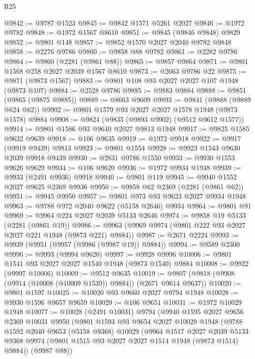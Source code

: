 \begin{lexlean}{R25}
\begin{coremodule}
@9842 := @9787 @1523
@9845 := @9842 @1571 @5261 @2027
@9846 := @1972 @9782
@9848 := @1972 @1567 @8610
@9851 := @9845 (@9846 @9848) @9829
@9852 := @9801 @148
@9857 := @9852 @1570 @2027 @2040 @9782 @9848
@9858 := @2276 @9786
@9860 := @9858 @88 @9782
@9861 := @2282 @9786
@9864 := @9860 (@2281 (@9861 @88))
@9865 := @9857 @9864
@9871 := @9801 @1568 @258 @2027 @2039 @1567 @8610
@9873 := @2663 @9786 @22
@9875 := @9871 (@9873 @1567)
@9883 := @9801 @108 @93 @2027 @2027 @107 @1948 (@9873 @107)
@9884 := @2528 @9786
@9885 := @9883 @9884
@9888 := @9851 (@9865 (@9875 @9885))
@9889 := @8663 @9609
@9893 := @9841 (@9888 (@9889 @624 @62))
@9902 := @9801 @1579 @93 @2027 @2027 @1578 @1948 (@9873 @1578) @9884
@9908 := @9824 (@9835 (@9893 @9902) (@9512 @9612 @1577))
@9914 := @9801 @1586 @93 @9640 @2027 @9813 @1948
@9917 := @9825 @1585 @9632 @9639
@9918 := @106 @9635
@9919 := @1972 @9918
@9922 := @9917 (@9919 @9439) @9813
@9923 := @9801 @1554
@9928 := @9923 @1543 @9630 @2039 @9918 @9439
@9930 := @2831 @9786 @1550
@9933 := @9930 @1553 @9626 @9629
@9934 := @106 @9620
@9936 := @1972 @9934 @1948
@9939 := @9933 (@2491 @9936) @9918
@9940 := @9801 @119
@9945 := @9940 @1552 @2027 @9625 @2369 @9936
@9950 := @9858 @62 @2369 (@2281 (@9861 @62))
@9951 := @9945 @9950
@9957 := @9801 @973 @93 @9623 @2027 @9934 @1948
@9963 := @9788 @972 @2040 @9622 (@5158 @2646) @9934
@9964 := @9801 @91
@9969 := @9964 @224 @2027 @2039 @5133 @2646
@9974 := @9858 @19 @5133 (@2281 (@9861 @19))
@9986 := @9963 (@9969 @9974 (@9801 @222 @93 @2027 @2027 @221 @1948 (@9873 @221) @9884))
@9987 := @2671 @2224
@9993 := @9939 (@9951 (@9957 (@9986 (@9987 @19)) @9884))
@9994 := @9589 @2300
@9996 := @9993 (@9994 @9620)
@9997 := @9928 @9996
@10006 := @9801 @1541 @93 @2027 @2027 @1540 @1948 (@9873 @1540) @9884
@10008 := @9922 (@9997 @10006)
@10009 := @9512 @9635
@10019 := @9807 (@9818 (@9908 (@9914 (@10008 (@10009 @1539)) @9884)) (@2671 @9614 @9637))
@10020 := @9801 @1597
@10025 := @10020 @93 @9660 @2027 @9794 @1948
@10028 := @9930 @1596 @9657 @9659
@10029 := @106 @9651
@10031 := @1972 @10029 @1948
@10077 := @10028
    (@2491 @10031)
    @9794
    (@9940
      @1595
      @2027
      @9656
      @2369
      @10031
      @9950
      (@9801
        @1593
        @93
        @9654
        @2027
        @10029
        @1948
        (@9788
          @1592
          @2040
          @9653
          (@5158 @9368)
          @10029
          (@9964
            @1517
            @2027
            @2039
            @5133
            @9368
            @9974
            (@9801 @1515 @93 @2027 @2027 @1514 @1948 (@9873 @1514) @9884))
          (@9987 @88))

\end{coremodule}
\end{lexlean}
